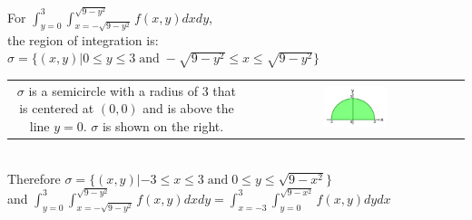 \documentclass{article}
\newcommand{\dr}[1]{\textcolor{dark_red}{#1}}
\begin{document}
\dr{\begin{framed}
For \(\int_{y = 0}^3 \int_{x = -\sqrt{9 - y^2}}^{\sqrt{9 - y^2}} f(x,y)dxdy\), \\
the region of integration is: \(\sigma = \{(x,y) | 0 \leq y \leq 3 \;\text{and}\; -\sqrt{9-y^2} \leq x \leq \sqrt{9-y^2}\}\) \\
\begin{tabular}{cc}
\parbox{0.6\textwidth}{
\(\sigma\) is a semicircle with a radius of \(3\) that is centered at \((0,0)\) and is above the line \(y = 0\). \(\sigma\) is shown on the right.
} & \parbox{0.4\textwidth}{
\includegraphics[width = 0.3\textwidth]{Test_bench_part_3x_images/Test_bench_part_3x_Solutions_image_14}
} 
\end{tabular} \\
Therefore \(\sigma = \{(x,y) | -3 \leq x \leq 3 \;\text{and}\; 0 \leq y \leq \sqrt{9 - x^2}\}\) \\
and \(\int_{y = 0}^3 \int_{x = -\sqrt{9 - y^2}}^{\sqrt{9 - y^2}} f(x,y)dxdy = \int_{x = -3}^3 \int_{y = 0}^{\sqrt{9 - x^2}} f(x,y)dydx\)
\end{framed}}

\pagebreak
\end{document}

